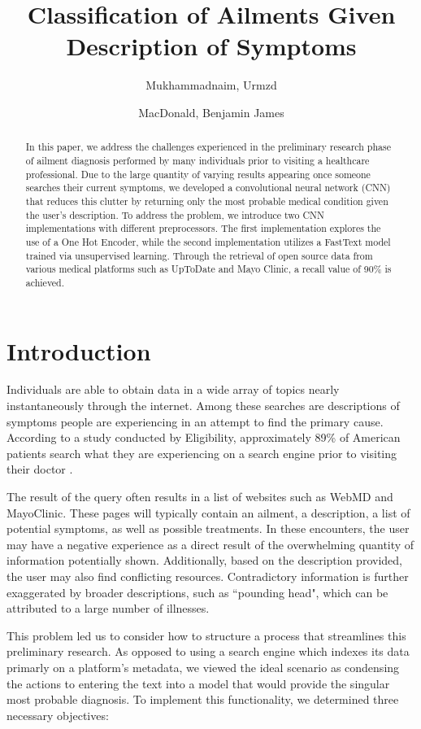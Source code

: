 \documentclass[12pt]{report}
\title{Classification of Ailments Given Description of Symptoms}
\author[1]{Mukhammadnaim, Urmzd}
\author[2]{MacDonald, Benjamin James}
\affil[1,2]{Faculty of Computer Science, Dalhousie University}
\begin{document}
\maketitle
\listoffigures
\tableofcontents
\begin{abstract}
	In this paper, we address the challenges experienced in the preliminary research phase
	of ailment diagnosis performed by many individuals prior to visiting a
	healthcare professional. Due to the large quantity of varying results appearing
	once someone searches their current symptoms, we developed a convolutional
	neural network (CNN) that reduces this clutter by returning only the most
	probable medical condition given the user's description.
	To address the problem, we introduce two CNN implementations with different
	preprocessors. The first implementation explores the use of a One Hot Encoder,
	while the second implementation utilizes a FastText model trained via
	unsupervised learning. Through the retrieval of open source data from various medical platforms such
	as UpToDate and Mayo Clinic, a recall value of 90\% is achieved.
\end{abstract}

\chapter{Introduction}
Individuals are able to obtain data in a wide array of topics nearly
instantaneously through the internet. Among these searches are descriptions of
symptoms people are experiencing in an attempt to find the primary cause.
According to a study conducted by Eligibility, approximately 89\% of American
patients search what they are experiencing on a search engine prior to visiting
their doctor \cite{guarino_2019}.

The result of the query often results in a list of websites such as WebMD and
MayoClinic. These pages will typically contain an ailment, a description,
a list of potential symptoms, as well as possible treatments. In these
encounters, the user may have a negative experience as a direct result of
the overwhelming quantity of information potentially shown. Additionally,
based on the description provided, the user may also find conflicting resources.
Contradictory information is further exaggerated by broader descriptions,
such as ``pounding head", which can be attributed to a large number of illnesses.

This problem led us to consider how to structure a process that streamlines this
preliminary research. As opposed to using a search engine which indexes its data primarly
on a platform's metadata, we viewed the ideal scenario as condensing the actions
to entering the text into a model that would provide the singular most probable
diagnosis. To implement this functionality, we determined three necessary
objectives:
\end{document}
